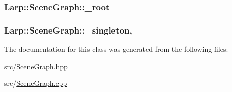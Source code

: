 \subsubsection[{\texorpdfstring{\+\_\+root}{_root}}]{ Larp\+::\+Scene\+Graph\+::\+\_\+root\hspace{0.3cm}{\ttfamily [private]}}\hypertarget{classLarp_1_1SceneGraph_adf33065344039fd7fce5f828e800137f}{}\label{classLarp_1_1SceneGraph_adf33065344039fd7fce5f828e800137f}
\subsubsection[{\texorpdfstring{\+\_\+singleton}{_singleton}}]{ Larp\+::\+Scene\+Graph\+::\+\_\+singleton\hspace{0.3cm}{\ttfamily [static]}, {\ttfamily [private]}}\hypertarget{classLarp_1_1SceneGraph_a7e022917365e62f172efa60d7addd242}{}\label{classLarp_1_1SceneGraph_a7e022917365e62f172efa60d7addd242}


The documentation for this class was generated from the following files\+:\begin{DoxyCompactItemize}
\item 
src/\hyperlink{SceneGraph_8hpp}{Scene\+Graph.\+hpp}\item 
src/\hyperlink{SceneGraph_8cpp}{Scene\+Graph.\+cpp}\end{DoxyCompactItemize}
